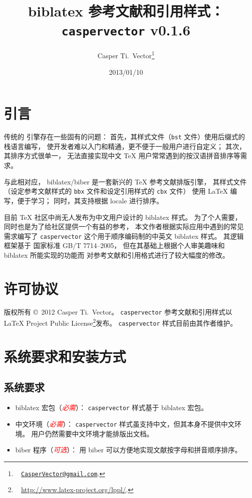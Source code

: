 \documentclass[UTF8, fancyhdr, hyperref]{ctexart}
\newcommand{\myemph}[1]{\emph{\textcolor{red}{#1}}}
\begin{document}
\title{\textbf{biblatex 参考文献和引用样式：\texttt{caspervector} v0.1.6}}
\author{%
	Casper Ti.\ Vector\thanks{\ %
		\href{mailto:CasperVector@gmail.com}{\texttt{CasperVector@gmail.com}}.%
	}%
}
\date{2013/01/10}
\maketitle

\section{引言}

传统的  引擎存在一些固有的问题：
首先，其样式文件（\verb|bst| 文件）使用后缀式的栈语言编写，
使开发者难以入门和精通，更不便于一般用户进行自定义；
其次，其排序方式很单一，
无法直接实现中文 \TeX{} 用户常常遇到的按汉语拼音排序等需求。

与此相对应，
biblatex\supercite{biblatex}/biber\supercite{biber}
是一套新兴的 \TeX{} 参考文献排版引擎，
其样式文件（设定参考文献样式的 \verb|bbx| 文件和设定引用样式的 \verb|cbx| 文件）
使用 \LaTeX{} 编写，便于学习；
同时，其支持根据 locale 进行排序。

目前 \TeX{} 社区中尚无人发布为中文用户设计的 biblatex 样式。
为了个人需要，同时也是为了给社区提供一个有益的参考，
本文作者根据实际应用中遇到的常见需求编写了
\verb|caspervector| 这个用于顺序编码制的中英文 biblatex 样式。
其逻辑框架基于
国家标准 GB/T 7714--2005\supercite{gbt7714-2005}，
但在其基础上根据个人审美趣味和 biblatex 所能实现的功能而
对参考文献和引用格式进行了较大幅度的修改。

\section{许可协议}

版权所有 \copyright\ 2012 Casper Ti.\ Vector。%
\verb|caspervector| 参考文献和引用样式以
\LaTeX{} Project Public License\footnote{\ %
	\url{http://www.latex-project.org/lppl/}.%
}发布。%
\verb|caspervector| 样式目前由其作者维护。

\section{系统要求和安装方式}
\subsection{系统要求}

\begin{itemize}
	\item biblatex 宏包（\myemph{必需}）：
		\verb|caspervector| 样式基于 biblatex 宏包。
	\item 中文环境（\myemph{必需}）：
		\verb|caspervector| 样式虽支持中文，但其本身不提供中文环境。
		用户仍然需要中文环境才能排版出文档。
	\item biber 程序（\myemph{可选}）：
		用 biber 可以方便地实现文献按字母和拼音顺序排序。
\end{itemize}
\end{document}
